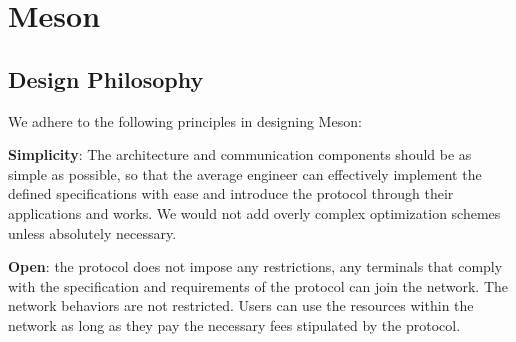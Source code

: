 \documentclass[12pt, a4paper, unicode]{report}
\begin{document}
    
%
%
%


    \chapter{Meson}
    \section{Design Philosophy}
    We adhere to the following principles in designing Meson:
    
    \textbf{Simplicity}: The architecture and communication components should be as simple as possible, so that the average engineer can effectively implement the defined specifications with ease and introduce the protocol through their applications and works. We would not add overly complex optimization schemes unless absolutely necessary.
    
    \textbf{Open}: the protocol does not impose any restrictions, any terminals that comply with the specification and requirements of the protocol can join the network. The network behaviors are not restricted. Users can use the resources within the network as long as they pay the necessary fees stipulated by the protocol.
    
\end{document}
